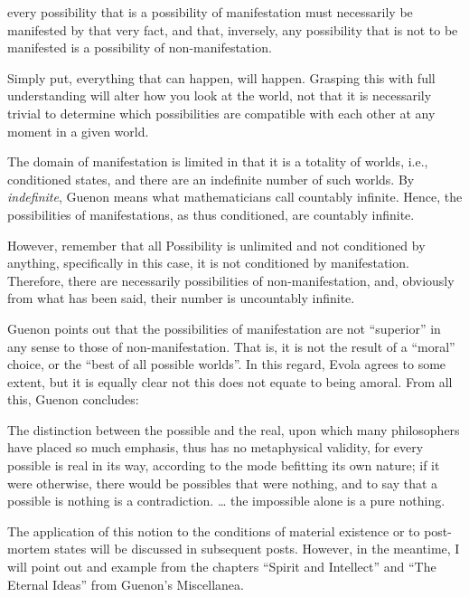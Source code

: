 \begin{quotex}
every possibility that is a possibility of manifestation must necessarily be manifested by that very fact, and that, inversely, any possibility that is not to be manifested is a possibility of non-manifestation.

\end{quotex}
Simply put, everything that can happen, will happen. Grasping this with full understanding will alter how you look at the world, not that it is necessarily trivial to determine which possibilities are compatible with each other at any moment in a given world.

The domain of manifestation is limited in that it is a totality of worlds, i.e., conditioned states, and there are an indefinite number of such worlds. By \emph{indefinite}, Guenon means what mathematicians call countably infinite. Hence, the possibilities of manifestations, as thus conditioned, are countably infinite.

However, remember that all Possibility is unlimited and not conditioned by anything, specifically in this case, it is not conditioned by manifestation. Therefore, there are necessarily possibilities of non-manifestation, and, obviously from what has been said, their number is uncountably infinite.

Guenon points out that the possibilities of manifestation are not “superior” in any sense to those of non-manifestation. That is, it is not the result of a “moral” choice, or the “best of all possible worlds”. In this regard, Evola agrees to some extent, but it is equally clear not this does not equate to being amoral. From all this, Guenon concludes:

\begin{quotex}
The distinction between the possible and the real, upon which many philosophers have placed so much emphasis, thus has no metaphysical validity, for every possible is real in its way, according to the mode befitting its own nature; if it were otherwise, there would be possibles that were nothing, and to say that a possible is nothing is a contradiction. … the impossible alone is a pure nothing. 

\end{quotex}
The application of this notion to the conditions of material existence or to post-mortem states will be discussed in subsequent posts. However, in the meantime, I will point out and example from the chapters “Spirit and Intellect” and “The Eternal Ideas” from Guenon's Miscellanea.

